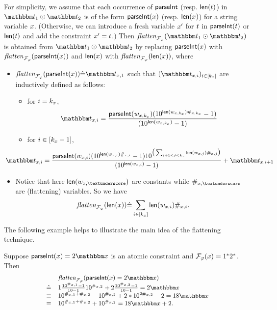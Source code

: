 For simplicity, we assume that each occurrence of $\textsf{parseInt}$ (resp. $\textsf{len}(t)$) in $\iterm_1 \op \iterm_2$ is of the form $\textsf{parseInt}(x)$ (resp. $\textsf{len}(x)$) for a string variable $x$. (Otherwise, we can introduce a fresh variable $x'$ for $t$ in $\textsf{parseInt}(t)$ or $\textsf{len}(t)$ and add the constraint $x' = t$.)
Then $\flatten_{\flatfun_\varphi}(\iterm_1 \op \iterm_2)$ is obtained from $\iterm_1 \op \iterm_2$ by replacing $\textsf{parseInt}(x)$ with $\mathit{flatten}_{\mathcal{F}_\varphi}(\textsf{parseInt}(x))$ and $\textsf{len}(x)$ with $\mathit{flatten}_{\mathcal{F}_\varphi}(\textsf{len}(x))$, where 
\begin{itemize}
\item 
$\flatten_{\flatfun_\varphi}(\parseInt(\svarx)) \Def \iterm_{\svarx,1}$  such that $(\iterm_{\svarx, i})_{i \in [k_\svarx]}$ are inductively defined as follows: 
\begin{itemize}
\item for $i = k_x$, 
$$\iterm_{\svarx, i} = \frac{\parseInt(w_{\svarx, k_\svarx}) (10^{\len(w_{\svarx,k_\svarx})\#_{\svarx, k_\svarx}} -1 )}{(10^{\len(w_{\svarx, k_\svarx}) } -1 )}$$ 
%
\item for $i \in [k_x-1]$, 
%
$$ \hspace{-1.2cm} \iterm_{\svarx, i} =  \frac{\parseInt(w_{\svarx, i}) (10^{\len(w_{\svarx, i})  \#_{\svarx, i} } -1 ) 10^{\big(\sum_{i+1\le j\le k_x} \len(w_{\svarx, j})  \#_{\svarx, j}\big)}} {(10^{\len(w_{\svarx, i}) } -1 )} + \iterm_{\svarx, i+1}$$
\end{itemize}
%
\item Notice that here $\len( w_{\svarx, \textunderscore } )$ are constants while $\#_{\svarx, \textunderscore}$ are (flattening) variables. So we have 
$$\mathit{flatten}_{\mathcal{F}_\varphi}(\textsf{len}(x)) \hat{=} \sum \limits_{i \in [k_{x}]} \textsf{len}(w_{x, i})  \#_{x, i}.$$ 
\end{itemize} 

The following example helps to illustrate the main idea of the flattening technique.

\begin{example}
Suppose $\parseInt(\svarx) = 2\ivarx$ is an atomic constraint and $\mathcal{F}_\varphi(x) = 1^*2^*$. Then 
\[
\small
\begin{array}{l l}
& \flatten_{\flatfun_\varphi}(\parseInt(\svarx)  =  2\ivarx)  \\
\Def & 1 \frac{10^{\#_{\svarx,1}}-1}{10-1}10^{\#_{\svarx,2}}  + 2 \frac{10^{\#_{\svarx,2}}-1}{10-1} = 2\ivarx   \\
\equiv & 10^{\#_{\svarx,1}+\#_{\svarx,2}} - 10^{\#_{\svarx,2}}  + 2*10^{2\#_{\svarx,2}}- 2 = 18\ivarx \\
\equiv & 10^{\#_{\svarx,1}+\#_{\svarx,2}} +  10^{\#_{\svarx,2}} = 18\ivarx + 2.
\end{array}
\]
\end{example}

